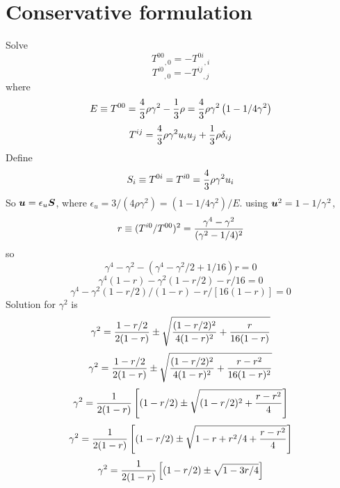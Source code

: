 \documentclass[twocolumn]{article}
\title{}
\author{}
\date{\today,~ $ $Revision: 1.31 $ $}
\begin{document}

\section{Conservative formulation}

Solve
\begin{equation}
{T^{00}}_{,0}=-{T^{0i}}_{,i}
\end{equation}
\begin{equation}
{T^{i0}}_{,0}=-{T^{ij}}_{,j}
\end{equation}
where
\begin{equation}
E\equiv T^{00}={4\over3}\rho\gamma^2-{1\over3}\rho
={4\over3}\rho\gamma^2\left(1-1/4\gamma^2\right)
\end{equation}
\begin{equation}
T^{ij}={4\over3}\rho\gamma^2 u_i u_j+{1\over3}\rho\delta_{ij}
\label{hydroStress}
\end{equation}
Define
\begin{equation}
S_i\equiv T^{0i}=T^{i0}={4\over3}\rho\gamma^2 u_i
\end{equation}
So $\bm{u}=\epsilon_u \bm{S}$, where
$\epsilon_u=3/(4\rho\gamma^2)=(1-1/4\gamma^2)/E$.
using $\bm{u}^2=1-1/\gamma^2$,
\begin{equation}
r\equiv(T^{i0}/T^{00})^2={\gamma^4-\gamma^2\over(\gamma^2-1/4)^2}
\end{equation}
so
\begin{equation}
\gamma^4-\gamma^2-(\gamma^4-\gamma^2/2+1/16) r=0
\end{equation}
\begin{equation}
\gamma^4(1-r)-\gamma^2(1-r/2)-r/16=0
\end{equation}
\begin{equation}
\gamma^4-\gamma^2(1-r/2)/(1-r)-r/[16(1-r)]=0
\end{equation}
Solution for $\gamma^2$ is
\begin{equation}
\gamma^2={1-r/2\over2(1-r)}\pm\sqrt{
{(1-r/2)^2\over4(1-r)^2}+{r\over16(1-r)}}
\end{equation}
\begin{equation}
\gamma^2={1-r/2\over2(1-r)}\pm\sqrt{
{(1-r/2)^2\over4(1-r)^2}+{r-r^2\over16(1-r)^2}}
\end{equation}
\begin{equation}
\gamma^2={1\over2(1-r)}\left[(1-r/2)\pm\sqrt{
(1-r/2)^2+{r-r^2\over4}}\right]
\end{equation}
\begin{equation}
\gamma^2={1\over2(1-r)}\left[(1-r/2)\pm\sqrt{
1-r+r^2/4+{r-r^2\over4}}\right]
\end{equation}
\begin{equation}
\gamma^2={1\over2(1-r)}\left[(1-r/2)\pm\sqrt{
1-3r/4}\right]
\label{34eqn}
\end{equation}
\end{document}
